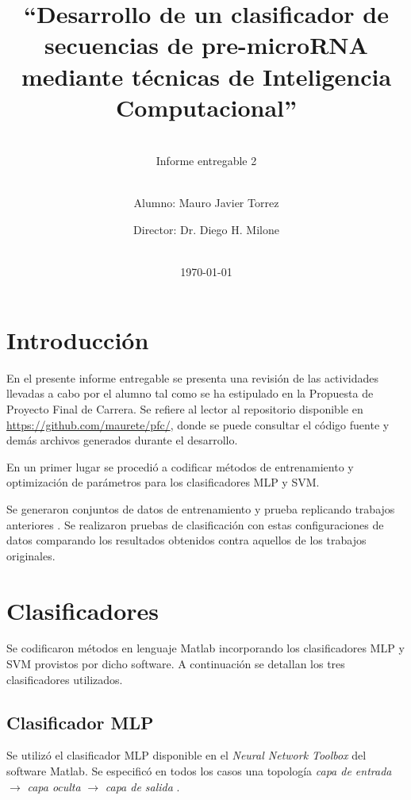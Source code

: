 \documentclass[12pt,bibliography=oldstyle,DIV=12,parskip=half-,titlepage]{scrartcl}
\begin{document}
%
%
\titlehead{\center\large
    Universidad Nacional del Litoral\\
    Facultad de Ingeniería y Ciencias Hídricas
}
%
%
\title{\LARGE ``Desarrollo de un clasificador de secuencias de pre-microRNA
  mediante técnicas de Inteligencia Computacional''}
\subject{Proyecto Final de Carrera\\Ingeniería en
  Informática}
\subtitle{~\\[.2ex]Informe entregable 2\\[.2ex]~}
\author{{Alumno: Mauro Javier Torrez}\and{Director: Dr. Diego H. Milone}}
%
\date{~\\[2em]\today}
%
\renewcommand*{\titlepagestyle}{empty}
\maketitle
\setcounter{page}{1}
%
%
%
%
\section{Introducción}
En el presente informe entregable se presenta una revisión de las
actividades llevadas a cabo por el alumno tal como se ha estipulado en
la Propuesta de Proyecto Final de Carrera.  Se refiere al lector al
repositorio disponible en \url{https://github.com/maurete/pfc/}, donde
se puede consultar el código fuente y demás archivos generados durante
el desarrollo.

En un primer lugar se procedió a codificar métodos de entrenamiento y
optimización de parámetros para los clasificadores MLP y SVM.

Se generaron conjuntos de datos de entrenamiento y prueba replicando
trabajos anteriores \cite{xue} \cite{ng} \cite{batuwita}.  Se
realizaron pruebas de clasificación con estas configuraciones de datos
comparando los resultados obtenidos contra aquellos de los trabajos
originales.

%
\section{Clasificadores}
Se codificaron métodos en lenguaje Matlab incorporando los
clasificadores MLP y SVM provistos por dicho software. A continuación
se detallan los tres clasificadores utilizados.
%
\subsection{Clasificador MLP}
Se utilizó el clasificador MLP disponible en el \emph{Neural Network
  Toolbox} del software Matlab. Se especificó en todos los casos una
topología \emph{capa de entrada} $\rightarrow$ \emph{capa oculta}
$\rightarrow$ \emph{capa de salida} .
\end{document}
